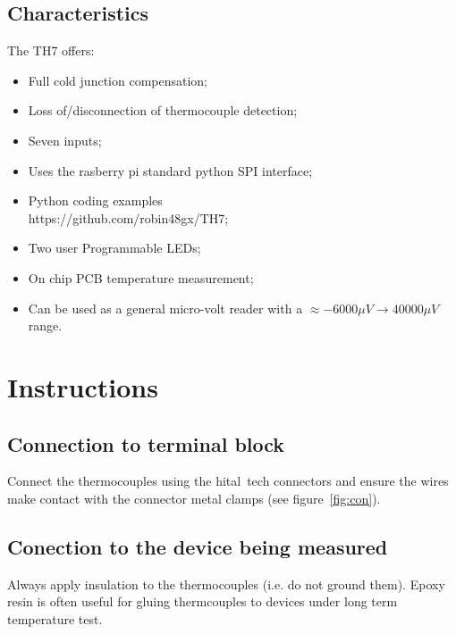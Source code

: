 \documentclass[10pt,foldmark]{leaflet}
\begin{document}
\subsection{Characteristics}
The TH7 offers:
\begin{itemize}
 \item Full cold junction compensation;
 \item Loss of/disconnection of thermocouple detection;
 \item Seven inputs;
 \item Uses the rasberry pi standard python SPI interface;
 \item Python coding examples \\ https://github.com/robin48gx/TH7;
 \item Two user Programmable LEDs;
 \item On chip PCB temperature measurement;
  \item Can be used as a general micro-volt reader with a $\approx -6000 \mu V \rightarrow 40000 \mu V$ range.
\end{itemize} 

\section{Instructions}
\subsection{Connection to terminal block}
Connect the thermocouples using the hital~tech connectors and ensure the wires make contact with the 
connector metal clamps (see figure~\ref{fig:con}).
\subsection{Conection to the device being measured}
Always apply insulation to the thermocouples (i.e. do not ground them).
Epoxy resin is often useful for gluing thermcouples to devices under long term temperature test.
\end{document}
